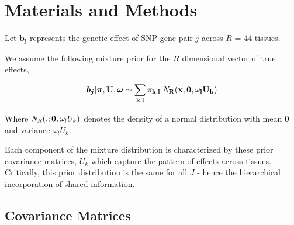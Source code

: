 
\section*{Materials and Methods}

Let  $\bm{b_{j}}$ represents the genetic effect of SNP-gene pair $j$ across $R$ = 44 tissues.

We assume the following mixture prior for the $R$ dimensional vector of true effects,  

 \begin{equation}
  \bm{b_{j}} | \bm{\pi},\bf{U}, \bm{\omega} \sim \sum_{k,l} \pi_{k,l} \;{\it N}_R(x; \bm{0}, \omega_l U_{k})
\end{equation}

Where ${\it N}_R(.; \bm{0}, \omega_l U_{k})$ denotes the density of a normal distribution with mean $\bm{0}$ and variance $\omega_l U_{k}$.


Each component of the mixture distribution is characterized by these prior covariance matrices, $U_{k}$ which capture the pattern of effects across tissues. Critically, this prior distribution is the same for all $J$ - hence the hierarchical incorporation of shared information.

\subsection{ Covariance Matrices}

